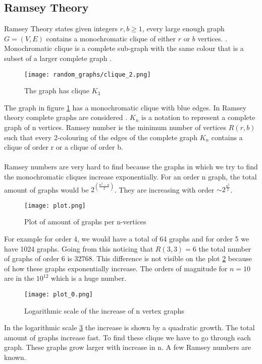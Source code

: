 \documentclass{Assignment}
\begin{document}
\subsection{Ramsey Theory}
Ramsey Theory states given integers $ r,b\geq 1$, every large enough graph $G = (V,E)$ contains a monochromatic clique of either $r$ or $b$ vertices.  \cite{katz2018introduction}.
Monochromatic clique is a complete sub-graph with the same colour that is a subset of a larger complete graph \cite{BondyMurty2008}.
\begin{figure}[H]
	\centering
	\texttt{[image: random\_graphs/clique\_2.png]}
	\caption{The graph has clique $K_3$}
	\label{clique}
\end{figure}
The graph in figure \ref{clique} has a monochromatic clique with blue edges.
In Ramsey theory complete graphs are considered \cite{burr1981generalized}.
$K_n$ is a notation to represent a complete graph of n vertices.
Ramsey number is the minimum number of vertices $R(r,b)$ such that every 2-colouring of the edges of the complete graph $K_n$ contains a clique of order r or a clique of order b.
\\\\
Ramsey numbers are very hard to find because the graphs in which we try to find the monochromatic cliques increase exponentially.
For an order n graph, the total amount of graphs would be $2^{\left(\frac{n^2-n}{2}\right)}$.
They are increasing with order $\sim 2^{\frac{n^2}{2}}$.
\begin{figure}[H]
	\centering
	\texttt{[image: plot.png]}
	\caption{Plot of amount of graphs per n-vertices}
	\label{plot}
\end{figure}
For example for order 4, we would have a total of 64 graphs and for order 5 we have 1024 graphs.
Going from this noticing that $R(3,3) = 6$ the total number of graphs of order 6 is $32768$.
This difference is not visible on the plot \ref{plot} because of how these graphs exponentially increase.
The orders of magnitude for $n= 10$ are in the $10^{12}$ which is a huge number.
\begin{figure}[H]
	\centering
	\texttt{[image: plot\_0.png]}
	\caption{Logarithmic scale of the increase of n vertex graphs}
	\label{plot_0}
\end{figure}
In the logarithmic scale \ref{plot_0} the increase is shown by a quadratic growth.
The total amount of graphs increase fast.
To find these clique we have to go through each graph.
These graphs grow larger with increase in n.
A few Ramsey numbers are known.
\end{document}
